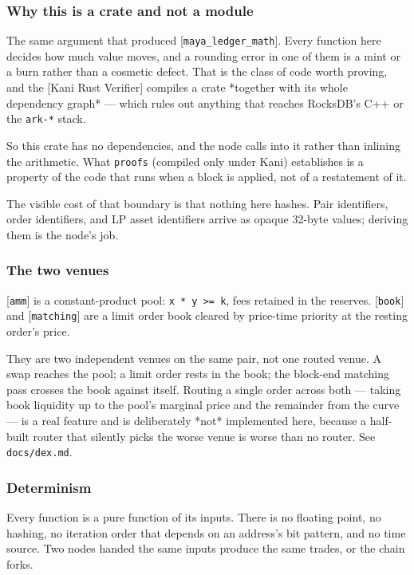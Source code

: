 \documentclass[11pt,a4paper]{article}
\begin{document}
\subsubsection{Why this is a crate and not a module}

The same argument that produced [\texttt{maya\_ledger\_math}]. Every function here
decides how much value moves, and a rounding error in one of them is a mint
or a burn rather than a cosmetic defect. That is the class of code worth
proving, and the [Kani Rust Verifier] compiles a crate *together with its
whole dependency graph* — which rules out anything that reaches RocksDB's
C++ or the \texttt{ark-*} stack.

So this crate has no dependencies, and the node calls into it rather than
inlining the arithmetic. What \texttt{proofs} (compiled only under Kani) establishes is a property of the
code that runs when a block is applied, not of a restatement of it.

The visible cost of that boundary is that nothing here hashes. Pair
identifiers, order identifiers, and LP asset identifiers arrive as opaque
32-byte values; deriving them is the node's job.

\subsubsection{The two venues}

[\texttt{amm}] is a constant-product pool: \texttt{x * y >= k}, fees retained in the
reserves. [\texttt{book}] and [\texttt{matching}] are a limit order book cleared by
price-time priority at the resting order's price.

They are two independent venues on the same pair, not one routed venue. A
swap reaches the pool; a limit order rests in the book; the block-end
matching pass crosses the book against itself. Routing a single order across
both — taking book liquidity up to the pool's marginal price and the
remainder from the curve — is a real feature and is deliberately *not*
implemented here, because a half-built router that silently picks the worse
venue is worse than no router. See \texttt{docs/dex.md}.

\subsubsection{Determinism}

Every function is a pure function of its inputs. There is no floating point,
no hashing, no iteration order that depends on an address's bit pattern, and
no time source. Two nodes handed the same inputs produce the same trades, or
the chain forks.
\end{document}
